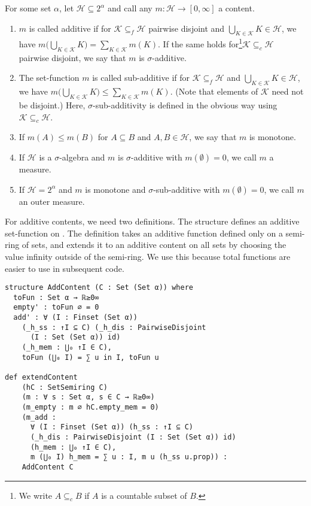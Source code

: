 \documentclass[lean]{DraftAFM}
\begin{document}
\begin{definition}\label{def:content}
  For some set $\alpha$, let $\mathcal H \subseteq 2^\alpha$
  and call any $m : \mathcal H \to [0,\infty]$ a
    content.
  \begin{enumerate}
  \item $m$ is called additive if for $\mathcal K \subseteq_f \mathcal
    H$ pairwise disjoint and $\bigcup_{K \in \mathcal K} K \in
    \mathcal H$, we have $m \Big(\bigcup_{K \in \mathcal K} K \Big) =
    \sum_{K \in \mathcal K} m(K)$. If the same holds for\footnote {We
      write $A \subseteq_c B$ if $A$ is a countable subset of
      $B$.}$\mathcal K \subseteq_c \mathcal H$ pairwise disjoint, we
    say that $m$ is $\sigma$-additive.
  \item The set-function $m$ is called sub-additive if for $\mathcal K
    \subseteq_f \mathcal H$ and $\bigcup_{K \in \mathcal K} K \in
    \mathcal H$, we have $m \Big(\bigcup_{K \in \mathcal K} K \Big)
    \leq \sum_{K \in \mathcal K} m(K)$. (Note that elements of
    $\mathcal K$ need not be disjoint.) Here, $\sigma$-sub-additivity
    is defined in the obvious way using $\mathcal K\subseteq_c
    \mathcal H$.
  \item If $m(A) \leq m(B)$ for $A\subseteq B$ and $A,B\in\mathcal H$,
    we say that $m$ is monotone.
  \item If $\mathcal H$ is a $\sigma$-algebra and $m$ is
    $\sigma$-additive with $m(\emptyset) = 0$, we call
    $m$ a measure.
  \item If $\mathcal H = 2^\alpha$ and $m$ is monotone and
    $\sigma$-sub-additive with $m(\emptyset)=0$, we call $m$ an outer
    measure.
  \end{enumerate}
\end{definition}

\noindent
For additive contents, we need two definitions.
The structure  defines
an additive set-function on .
The definition  takes an additive function defined only on a semi-ring of sets, and extends it to an additive content on all sets by choosing the value infinity outside of the semi-ring. We use this because total functions are easier to use in subsequent code.

\begin{verbatim}
structure AddContent (C : Set (Set α)) where
  toFun : Set α → ℝ≥0∞
  empty' : toFun ∅ = 0
  add' : ∀ (I : Finset (Set α))
    (_h_ss : ↑I ⊆ C) (_h_dis : PairwiseDisjoint
      (I : Set (Set α)) id)
    (_h_mem : ⋃₀ ↑I ∈ C),
    toFun (⋃₀ I) = ∑ u in I, toFun u

def extendContent
    (hC : SetSemiring C)
    (m : ∀ s : Set α, s ∈ C → ℝ≥0∞)
    (m_empty : m ∅ hC.empty_mem = 0)
    (m_add :
      ∀ (I : Finset (Set α)) (h_ss : ↑I ⊆ C)
      (_h_dis : PairwiseDisjoint (I : Set (Set α)) id)
      (h_mem : ⋃₀ ↑I ∈ C),
      m (⋃₀ I) h_mem = ∑ u : I, m u (h_ss u.prop)) :
    AddContent C
\end{verbatim}
\end{document}
